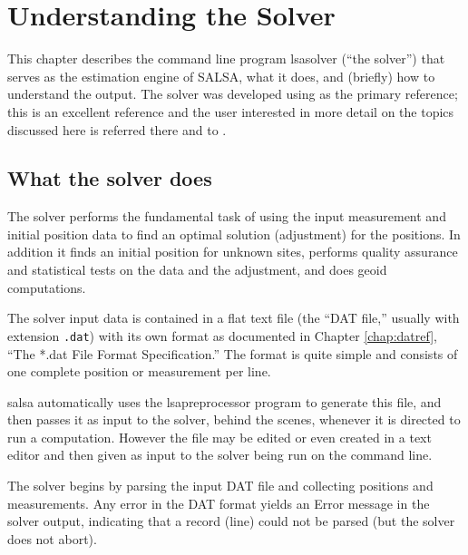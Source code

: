 

\chapter{Understanding the Solver}
\label{chap:UnderstandingSolver}

This chapter describes the command line program \textsf{lsasolver} (``the solver'') that serves as the estimation engine of SALSA, what it does, and (briefly) how to understand the output. The solver was developed using \cite{ghilani} as the primary reference; this is an excellent reference and the user interested in more detail on the topics discussed here is referred there and to \cite{leick}.

\section{What the solver does}
The solver performs the fundamental task of using the input measurement and initial position data to find an optimal solution (adjustment) for the positions. In addition it finds an initial position for unknown sites, performs quality assurance and statistical tests on the data and the adjustment, and does geoid computations.

The solver input data is contained in a flat text file (the ``DAT file,'' usually with extension \verb+.dat+) with its own format as documented in Chapter \ref{chap:datref}, ``The *.dat File Format Specification.'' The format is quite simple and consists of one complete position or measurement per line.

\textsf{salsa} automatically uses the \textsf{lsapreprocessor} program to generate this file, and then passes it as input to the solver, behind the scenes, whenever it is directed to run a computation. However the file may be edited or even created in a text editor and then given as input to the solver being run on the command line.

The solver begins by parsing the input DAT file and collecting positions and measurements. Any error in the DAT format yields an Error message in the solver output, indicating that a record (line) could not be parsed (but the solver does not abort).

